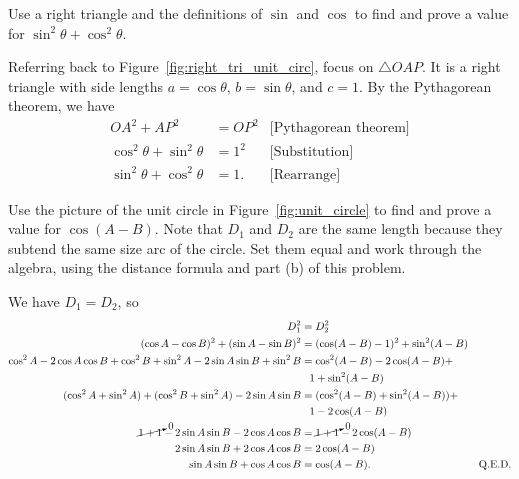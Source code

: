 \documentclass[../gatm_answers.tex]{subfiles}
\begin{document}
\begin{inner_problem}
\item Use a right triangle and the definitions of $\sin$ and $\cos$ to find and prove a value for $\sin^2 \theta + \cos^2 \theta$.
\end{inner_problem}

\noindent Referring back to Figure~\ref{fig:right_tri_unit_circ}, focus on $\triangle OAP$. It is a right triangle with side lengths $a=\cos\theta$, $b=\sin\theta$, and $c=1$. By the Pythagorean theorem, we have
\begin{align*}
OA^2+AP^2&=OP^2 & \text{[Pythagorean theorem]} \\
\cos^2\theta + \sin^2\theta &= 1^2 & \text{[Substitution]} \\
\sin^2\theta + \cos^2\theta &= 1. & \text{[Rearrange]}
\end{align*}

\begin{inner_problem}
\item Use the picture of the unit circle in Figure~\ref{fig:unit_circle} to find and prove a value for $\cos(A-B)$. Note that $D_1$ and $D_2$ are the same length because they subtend the same size arc of the circle. Set them equal and work through the algebra, using the distance formula and part (b) of this problem.
\end{inner_problem}

\noindent We have $D_1=D_2$, so
\begin{align*}
D_1^2&=D_2^2 \\
(\cos A - \cos B)^2 + (\sin A - \sin B)^2 &= (\cos(A-B)-1)^2+\sin^2 (A-B) \\
\cos^2 A - 2\cos A\cos B + \cos^2 B + \sin^2 A - 2\sin A\sin B + \sin^2 B &= \cos^2 (A-B) - 2\cos(A-B) + \\ &\phantom{=} 1+\sin^2(A-B) \\
(\cos^2 A + \sin^2 A) + (\cos^2 B + \sin^2 A) - 2\sin A\sin B &= (\cos^2 (A-B) + \sin^2(A-B)) + \\ &\phantom{=} 1 - 2\cos(A-B) \\
\cancelto{0}{1 + 1} - 2\sin A\sin B - 2\cos A\cos B &= \cancelto{0}{1 + 1} - 2\cos(A-B) \\
2\sin A\sin B + 2\cos A\cos B &= 2\cos(A-B) \\
\sin A\sin B + \cos A\cos B &= \cos(A-B). & \text{Q.E.D.}
\end{align*}
\end{document}
